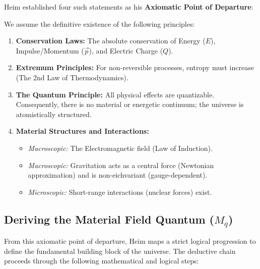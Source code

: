 \documentclass[11pt,a4paper,oneside]{article}
\begin{document}
Heim established four such statements as his \textbf{Axiomatic Point of Departure}:

\begin{tcolorbox}[colback=theorygray!20, colframe=theoryblue, title=\textbf{The Four Fundamental Axioms}]
We assume the definitive existence of the following principles:
\begin{enumerate}[label=\textbf{\alph*)}, leftmargin=*]
    \item \textbf{Conservation Laws:} The absolute conservation of Energy ($E$), Impulse/Momentum ($\vec{p}$), and Electric Charge ($Q$).
    \item \textbf{Extremum Principles:} For non-reversible processes, entropy must increase (The 2nd Law of Thermodynamics).
    \item \textbf{The Quantum Principle:} All physical effects are quantizable. Consequently, there is no material or energetic continuum; the universe is atomistically structured.
    \item \textbf{Material Structures and Interactions:}
    \begin{itemize}
        \item[\textbf{d1)}] \textit{Macroscopic:} The Electromagnetic field (Law of Induction).
        \item[\textbf{d2)}] \textit{Macroscopic:} Gravitation acts as a central force (Newtonian approximation) and is non-eichvariant (gauge-dependent).
        \item[\textbf{d3)}] \textit{Microscopic:} Short-range interactions (nuclear forces) exist.
    \end{itemize}
\end{enumerate}
\end{tcolorbox}

\subsection{Deriving the Material Field Quantum (\texorpdfstring{$M_q$}{Mq})}

From this axiomatic point of departure, Heim maps a strict logical progression to define the fundamental building block of the universe. The deductive chain proceeds through the following mathematical and logical steps:
\end{document}
